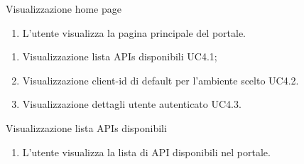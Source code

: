 \begin{usecase}{4}{Visualizzazione home page}\label{uc:visualizzasioen-home-page}

    \usecasemain{}
        \begin{enumerate}
            \item L'utente visualizza la pagina principale del portale.
        \end{enumerate}

    \usecasegen{}
        \begin{enumerate}
            \item Visualizzazione lista APIs disponibili UC4.1;
            \item Visualizzazione client-id di default per l'ambiente scelto UC4.2.
            \item Visualizzazione dettagli utente autenticato UC4.3. %
        \end{enumerate}

\end{usecase}

\begin{usecase}{4.1}{Visualizzazione lista APIs disponibili}\label{uc:visualizzazione-lista-apis-disponibili}

    \usecasemain{}
        \begin{enumerate}
            \item L'utente visualizza la lista di API disponibili nel portale.
        \end{enumerate}

\end{usecase}

